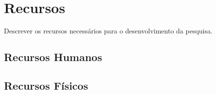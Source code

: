 \section{Recursos}
Descrever os recursos necessários para o desenvolvimento da pesquisa.
\subsection{Recursos Humanos}
\subsection{Recursos Físicos}



